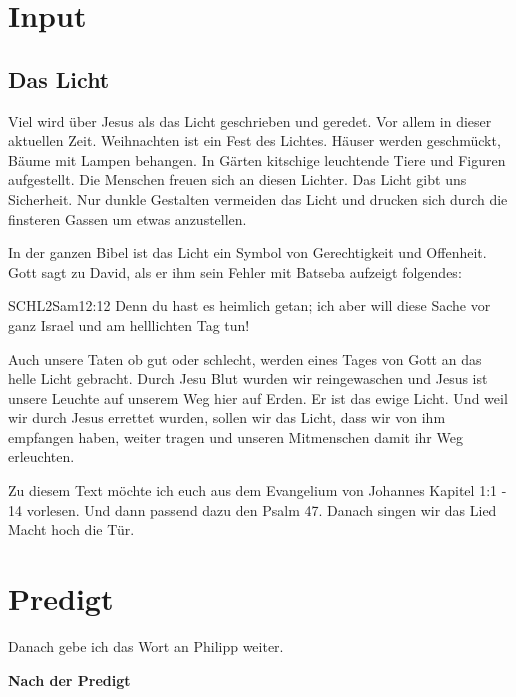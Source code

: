 \documentclass{../inc/mybib}
\begin{document}
\section{ Input }
\begin{spacing}{1.5}
\subsection{ Das Licht }

Viel wird über Jesus als das Licht geschrieben und geredet. Vor allem in dieser aktuellen Zeit. Weihnachten ist ein Fest des Lichtes. Häuser werden geschmückt, Bäume mit Lampen behangen. In Gärten kitschige leuchtende Tiere und Figuren aufgestellt. Die Menschen freuen sich an diesen Lichter. Das Licht gibt uns Sicherheit. Nur dunkle Gestalten vermeiden das Licht und drucken sich durch die finsteren Gassen um etwas anzustellen. 

In der ganzen Bibel ist das Licht ein Symbol von Gerechtigkeit und Offenheit. Gott sagt zu David, als er ihm sein Fehler mit Batseba aufzeigt folgendes:

\begin{bibeltext}{SCHL}{2Sam}{12:12}
Denn du hast es heimlich getan; ich aber will diese Sache vor ganz Israel und am helllichten Tag tun!
\end{bibeltext}

Auch unsere Taten ob gut oder schlecht, werden eines Tages von Gott an das helle Licht gebracht.
Durch Jesu Blut wurden wir reingewaschen und Jesus ist unsere Leuchte auf unserem Weg hier auf Erden. Er ist das ewige Licht. Und weil wir durch Jesus errettet wurden, sollen wir das Licht, dass wir von ihm empfangen haben, weiter tragen und unseren Mitmenschen damit ihr Weg erleuchten.

Zu diesem Text möchte ich euch aus dem Evangelium von Johannes Kapitel 1:1 - 14 vorlesen.
Und dann passend dazu den Psalm 47. Danach singen wir das Lied Macht hoch die Tür.

\end{spacing}


\section{Predigt}

Danach gebe ich das Wort an Philipp weiter.

\textbf{Nach der Predigt}
\end{document}
